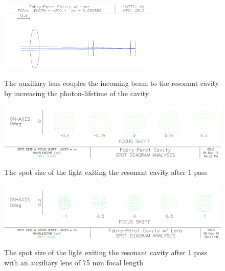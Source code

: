 \documentclass[12pt,journal]{IEEEtran}
\begin{document}
\begin{figure}[h!]
  \centering
	\includegraphics[width=3in]{./cavity/auxiliary_lens_resonant.png}\\
	\caption[Auxiliary Lens Setup]{The auxiliary lens couples the incoming beam to the resonant cavity by increasing the photon-lifetime of the cavity}
	\label{fig:aux-lens}
\end{figure}

\begin{figure}[tb]
  \centering
	\includegraphics[width=6.5in]{./cavity/spot_size.png}\\
	\caption[Resonant Cavity Setup]{The spot size of the light exiting the resonant cavity after 1 pass}
	\label{fig:mirror-setup}
\end{figure}

\begin{figure}[tb]
  \centering
	\includegraphics[width=6.5in]{./cavity/auxiliary_lens_spot_size.png}\\
	\caption[Resonant Cavity Setup]{The spot size of the light exiting the resonant cavity after 1 pass with an auxiliary lens of 75 mm focal length}
	\label{fig:aux-mirror-setup}
\end{figure}


\end{document}
